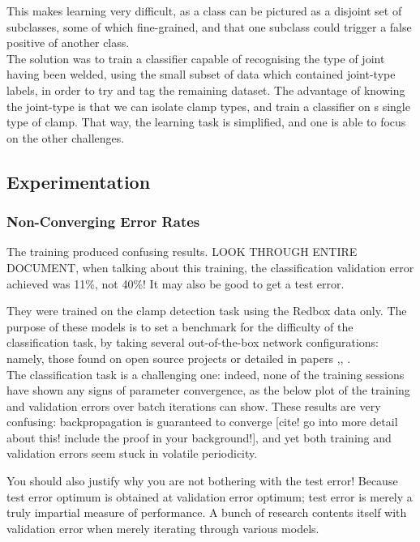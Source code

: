 \documentclass[a4paper,11pt]{article}
\begin{document}
This makes learning very difficult, as a class can be pictured as a disjoint set of subclasses, some of which fine-grained, and that one subclass could trigger a false positive of another class.\\

The solution was to train a classifier capable of recognising the type of joint having been welded, using the small subset of data which contained joint-type labels, in order to try and tag the remaining dataset. The advantage of knowing the joint-type is that we can isolate clamp types, and train a classifier on s single type of clamp. That way, the learning task is simplified, and one is able to focus on the other challenges. \\


\subsection{Experimentation}

\subsubsection{Non-Converging Error Rates}

The training produced confusing results. LOOK THROUGH ENTIRE DOCUMENT, when talking about this training, the classification validation error achieved was 11\%, not 40\%! It may also be good to get a test error.

They were trained on the clamp detection task using the Redbox data only. The purpose of these models is to set a benchmark for the difficulty of the classification task, by taking several out-of-the-box network configurations: namely, those found on open source projects or detailed in papers \cite{krizhevsky},\cite{transfer-learning}, \cite{decaf}. \\

The classification task is a challenging one: indeed, none of the training sessions have shown any signs of parameter convergence, as the below plot of the training and validation errors over batch iterations can show. These results are very confusing: backpropagation is guaranteed to converge [cite! go into more detail about this! include the proof in your background!], and yet both training and validation errors seem stuck in volatile periodicity.

You should also justify why you are not bothering with the test error! Because test error optimum is obtained at validation error optimum; test error is merely a truly impartial measure of performance. A bunch of research contents itself with validation error when merely iterating through various models. 
\end{document}
